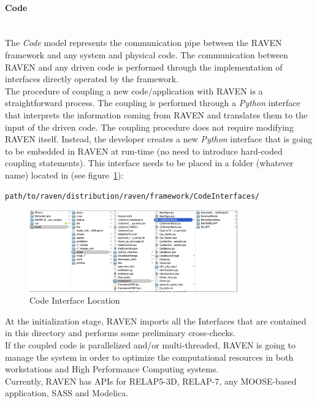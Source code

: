 \paragraph{Code} ~\\ 
The \textit{Code} model represents the communication pipe between the RAVEN framework and any system and physical code. The communication between RAVEN and any driven code is performed through the implementation of interfaces directly operated by the framework. 
\\The procedure of coupling a new code/application with RAVEN is a straightforward process. The coupling is performed through a \textit{Python}  interface that interprets the information coming from RAVEN and translates them to the input of the driven code. The coupling procedure does not require modifying RAVEN itself. Instead, the developer creates a new \textit{Python} interface that is going to be embedded in RAVEN at run-time (no need to introduce hard-coded coupling statements).  This interface needs to be placed in a folder (whatever name) located in (see figure~\ref{fig:CodeInterfaceLocation}):
\begin{lstlisting}[language=bash]
 path/to/raven/distribution/raven/framework/CodeInterfaces/
\end{lstlisting}

\begin{figure}
  \centering
  \includegraphics[width=0.8\textwidth]  {pics/CodeInterfaceLocation.png}
  \caption{Code Interface Location}
  \label{fig:CodeInterfaceLocation}
\end{figure}
At the initialization stage, RAVEN imports all the Interfaces that are contained in this directory and performs some preliminary cross-checks. 
\\ If the coupled code is parallelized and/or multi-threaded, RAVEN is going to manage the system in order to optimize the computational resources in both workstations and High Performance Computing systems.
\\Currently, RAVEN has APIs for RELAP5-3D, RELAP-7, any MOOSE-based application, SASS and Modelica.
